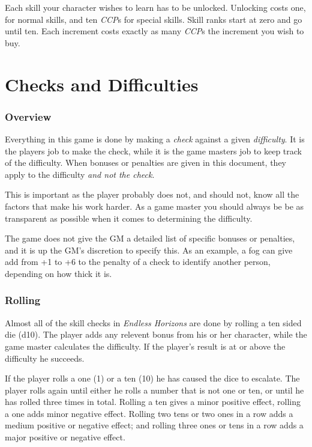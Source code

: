 \documentclass[11pt,a4paper,openany]{scrbook}
\begin{document}
Each skill your character wishes to learn has to be unlocked. Unlocking costs
one, for normal skills, and ten \emph{CCP}s for special skills. Skill ranks
start at zero and go until ten. Each increment costs exactly as many
\emph{CCP}s the increment you wish to buy.

\chapter{Checks and Difficulties}

\subsection{Overview}

Everything in this game is done by making a \emph{check} against a given
\emph{difficulty}. It is the players job to make the check, while it is the
game masters job to keep track of the difficulty. When bonuses or penalties
are given in this document, they apply to the difficulty \emph{and not the
  check}.

This is important as the player probably does not, and should not, know all
the factors that make his work harder. As a game master you should always be
be as transparent as possible when it comes to determining the difficulty.

The game does not give the GM a detailed list of specific bonuses or penalties,
and it is up the GM's discretion to specify this. As an example, a fog can give
add from +1 to +6 to the penalty of a check to identify another person,
depending on how thick it is.

\subsection{Rolling}

Almost all of the skill checks in \emph{Endless Horizons} are done by rolling
a ten sided die (d10). The player adds any relevent bonus from his or her
character, while the game master calculates the difficulty. If the player's
result is at or above the difficulty he succeeds.

If the player rolls a one (1) or a ten (10) he has caused the dice to escalate.
The player rolls again until either he rolls a number that is not one or ten,
or until he has rolled three times in total. Rolling a ten gives a minor
positive effect, rolling a one adds minor negative effect. Rolling two tens or
two ones in a row adds a medium positive or negative effect; and rolling three
ones or tens in a row adds a major positive or negative effect.
\end{document}
